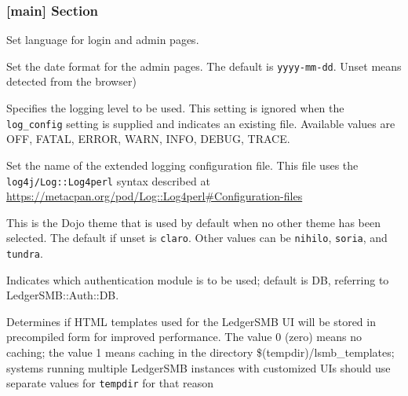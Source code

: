 \subsubsection{[main] Section}
\label{subsubsec-global-config-ledgersmb-conf-general}

\begin{description}[style=nextline]
        \item[language] Set language for login and admin pages. 
        \item[date\_format] Set the date format for the admin pages.  The default is \texttt{yyyy-mm-dd}. Unset means detected from the browser)
        \item[log\_level] Specifies the logging level to be used. This setting is ignored when the \texttt{log\_config} setting 
        is supplied and indicates an existing file. Available values are OFF, FATAL, ERROR, WARN, INFO, DEBUG, TRACE.
        \item [log\_config] Set the name of the extended logging configuration file. This file uses the \texttt{log4j/Log::Log4perl} syntax described at \url{https://metacpan.org/pod/Log::Log4perl#Configuration-files}
        \item [dojo\_theme] This is the Dojo theme that is used by default when no other theme
        has been selected.  The default if unset is \texttt{claro}. Other values can be \texttt{nihilo}, \texttt{soria}, and \texttt{tundra}.
        \item[auth] Indicates which authentication module is to be used; default is DB, referring to LedgerSMB::Auth::DB.
        \item[cache\_templates] Determines if HTML templates used for the LedgerSMB UI will be stored
        in precompiled form for improved performance. The value 0 (zero) means no caching; the value
        1 means caching in the directory \$(tempdir)/lsmb\_templates; systems running multiple
        LedgerSMB instances with customized UIs should use separate values for {\tt tempdir} for that
        reason

        
\end{description}

